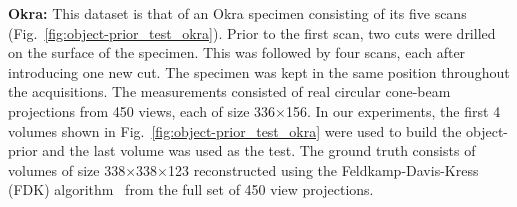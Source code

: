 \documentclass[journal]{IEEEtran}
\begin{document}
 \textbf{Okra:} This dataset is that of an Okra specimen consisting of its five
scans (Fig.~\ref{fig:object-prior_test_okra}). Prior to the first scan, two cuts were
drilled on the surface of the specimen. This was followed by four
scans, each after introducing one new cut. The specimen was kept in
the same position throughout the acquisitions. The measurements
consisted of real circular cone-beam projections from 450 views, each of size
336$\times$156. 
In our experiments, the first 4 volumes shown in Fig.~\ref{fig:object-prior_test_okra} were used to build the object-prior and the
last volume was used as the test. The ground truth
consists of volumes of size 338$\times$338$\times$123 reconstructed
using the Feldkamp-Davis-Kress (FDK) algorithm~\cite{FDK} from the
full set of 450 view projections.
\\
\end{document}
